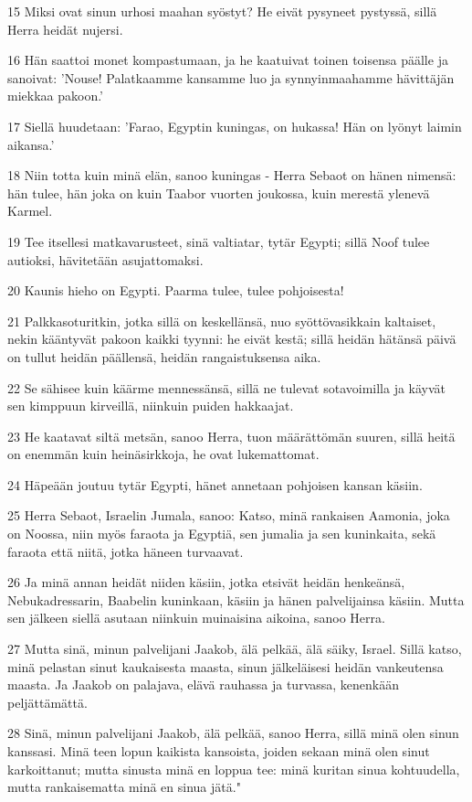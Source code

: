 \par 15 Miksi ovat sinun urhosi maahan syöstyt? He eivät pysyneet pystyssä, sillä Herra heidät nujersi.
\par 16 Hän saattoi monet kompastumaan, ja he kaatuivat toinen toisensa päälle ja sanoivat: 'Nouse! Palatkaamme kansamme luo ja synnyinmaahamme hävittäjän miekkaa pakoon.'
\par 17 Siellä huudetaan: 'Farao, Egyptin kuningas, on hukassa! Hän on lyönyt laimin aikansa.'
\par 18 Niin totta kuin minä elän, sanoo kuningas - Herra Sebaot on hänen nimensä: hän tulee, hän joka on kuin Taabor vuorten joukossa, kuin merestä ylenevä Karmel.
\par 19 Tee itsellesi matkavarusteet, sinä valtiatar, tytär Egypti; sillä Noof tulee autioksi, hävitetään asujattomaksi.
\par 20 Kaunis hieho on Egypti. Paarma tulee, tulee pohjoisesta!
\par 21 Palkkasoturitkin, jotka sillä on keskellänsä, nuo syöttövasikkain kaltaiset, nekin kääntyvät pakoon kaikki tyynni: he eivät kestä; sillä heidän hätänsä päivä on tullut heidän päällensä, heidän rangaistuksensa aika.
\par 22 Se sähisee kuin käärme mennessänsä, sillä ne tulevat sotavoimilla ja käyvät sen kimppuun kirveillä, niinkuin puiden hakkaajat.
\par 23 He kaatavat siltä metsän, sanoo Herra, tuon määrättömän suuren, sillä heitä on enemmän kuin heinäsirkkoja, he ovat lukemattomat.
\par 24 Häpeään joutuu tytär Egypti, hänet annetaan pohjoisen kansan käsiin.
\par 25 Herra Sebaot, Israelin Jumala, sanoo: Katso, minä rankaisen Aamonia, joka on Noossa, niin myös faraota ja Egyptiä, sen jumalia ja sen kuninkaita, sekä faraota että niitä, jotka häneen turvaavat.
\par 26 Ja minä annan heidät niiden käsiin, jotka etsivät heidän henkeänsä, Nebukadressarin, Baabelin kuninkaan, käsiin ja hänen palvelijainsa käsiin. Mutta sen jälkeen siellä asutaan niinkuin muinaisina aikoina, sanoo Herra.
\par 27 Mutta sinä, minun palvelijani Jaakob, älä pelkää, älä säiky, Israel. Sillä katso, minä pelastan sinut kaukaisesta maasta, sinun jälkeläisesi heidän vankeutensa maasta. Ja Jaakob on palajava, elävä rauhassa ja turvassa, kenenkään peljättämättä.
\par 28 Sinä, minun palvelijani Jaakob, älä pelkää, sanoo Herra, sillä minä olen sinun kanssasi. Minä teen lopun kaikista kansoista, joiden sekaan minä olen sinut karkoittanut; mutta sinusta minä en loppua tee: minä kuritan sinua kohtuudella, mutta rankaisematta minä en sinua jätä."

